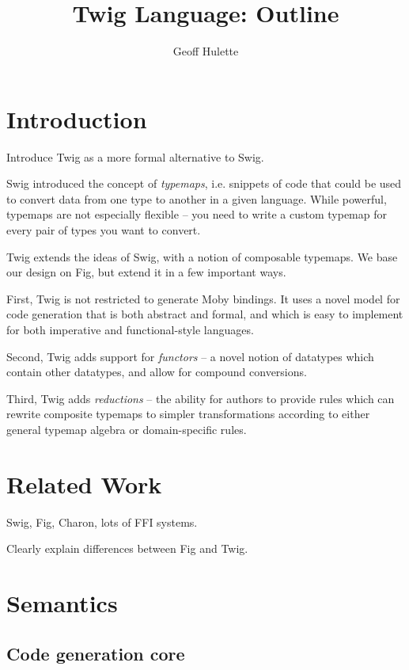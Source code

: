 \documentclass{article}
\begin{document}
\title{Twig Language: Outline}
\author{Geoff Hulette}

\maketitle


\section{Introduction}

Introduce Twig as a more formal alternative to Swig.

Swig introduced the concept of \emph{typemaps}, i.e. snippets of code that could
be used to convert data from one type to another in a given language. While
powerful, typemaps are not especially flexible -- you need to write a custom
typemap for every pair of types you want to convert.

Twig extends the ideas of Swig, with a notion of composable typemaps. We base
our design on Fig, but extend it in a few important ways.

First, Twig is not restricted to generate Moby bindings. It uses a novel model
for code generation that is both abstract and formal, and which is easy to
implement for both imperative and functional-style languages.

Second, Twig adds support for \emph{functors} -- a novel notion of datatypes
which contain other datatypes, and allow for compound conversions.

Third, Twig adds \emph{reductions} -- the ability for authors to provide rules
which can rewrite composite typemaps to simpler transformations according to
either general typemap algebra or domain-specific rules.

\section{Related Work}

Swig, Fig, Charon, lots of FFI systems. 

Clearly explain differences between Fig and Twig.


\section{Semantics}

\subsection{Code generation core}
\end{document}

